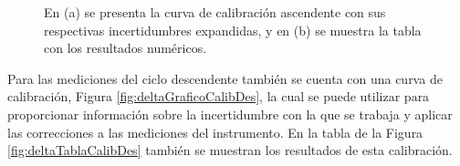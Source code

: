 \begin{figure}[H]
    \centering
    \begin{minipage}[b]{1\textwidth}
        \centering
    \end{minipage}  
    \hspace{1em} %
    \begin{minipage}[b]{0.7\textwidth}
        \centering
    \end{minipage}  
    \caption{En (a) se presenta la curva de calibración ascendente con sus respectivas incertidumbres expandidas, y en (b) se muestra la tabla con los resultados numéricos.}
    \label{fig:deltaResultCalibAsc}
\end{figure} 

Para las mediciones del ciclo descendente también se cuenta con una curva de calibración, Figura \ref{fig:deltaGraficoCalibDes}, la cual se puede utilizar para proporcionar información sobre la incertidumbre con la que se trabaja y aplicar las correcciones a las mediciones del instrumento. En la tabla de la Figura \ref{fig:deltaTablaCalibDes} también se muestran los resultados de esta calibración.


